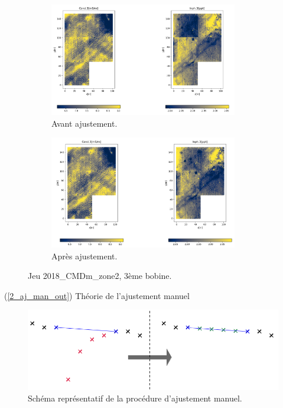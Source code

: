 \documentclass[12pt]{article}
\begin{document}
    \begin{figure}[ht!]
        \centering
        \begin{subfigure}[b]{\textwidth}
            \centering
            \includegraphics[width=0.9\textwidth]{Images/Frontiere_ex2_3.png}
            \caption[]%
            {{ \small Avant ajustement.}}    
        \end{subfigure}
        \centering
        \begin{subfigure}[b]{\textwidth}  
            \centering 
            \includegraphics[width=0.9\textwidth]{Images/Frontiere_ex2_3_aj.png}
            \caption[]%
            {{\small Après ajustement.}}    
        \end{subfigure}
        \caption{Jeu 2018\_CMDm\_zone2, 3ème bobine.}
    \end{figure}

\newpage

    \label{2_aj_man_in} (\ref{2_aj_man_out}) Théorie de l'ajustement manuel

    \begin{figure}[ht!]
        \centering
        \includegraphics[width=\textwidth]{Images/Base_Schema_of_all_time.png}  
        \caption{Schéma représentatif de la procédure d'ajustement manuel.}
    \end{figure}
\end{document}
